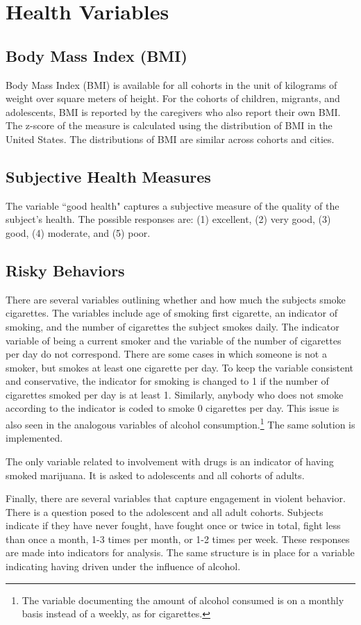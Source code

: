 \section{Health Variables}
\label{sec:health}

\subsection{Body Mass Index (BMI)}
Body Mass Index (BMI) is available for all cohorts in the unit of kilograms of weight over square meters of height. For the cohorts of children, migrants, and adolescents, BMI is reported by the caregivers who also report their own BMI. The z-score of the measure is calculated using the distribution of BMI in the United States. The distributions of BMI are similar across cohorts and cities.

\subsection{Subjective Health Measures}
The variable ``good health" captures a subjective measure of the quality of the subject's health. The possible responses are: (1) excellent, (2) very good, (3) good, (4) moderate, and (5) poor. 

\subsection{Risky Behaviors} 

There are several variables outlining whether and how much the subjects smoke cigarettes. The variables include age of smoking first cigarette, an indicator of smoking, and the number of cigarettes the subject smokes daily. The indicator variable of being a current smoker and the variable of the number of cigarettes per day do not correspond. There are some cases in which someone is not a smoker, but smokes at least one cigarette per day. To keep the variable consistent and conservative, the indicator for smoking is changed to 1 if the number of cigarettes smoked per day is at least 1. Similarly, anybody who does not smoke according to the indicator is coded to smoke 0 cigarettes per day. This issue is also seen in the analogous variables of alcohol consumption.\footnote{The variable documenting the amount of alcohol consumed is on a monthly basis instead of a weekly, as for cigarettes.} The same solution is implemented. 

The only variable related to involvement with drugs is an indicator of having smoked marijuana. It is asked to adolescents and all cohorts of adults.

Finally, there are several variables that capture engagement in violent behavior. There is a question posed to the adolescent and all adult cohorts. Subjects indicate if they have never fought, have fought once or twice in total, fight less than once a month, 1-3 times per month, or 1-2 times per week. These responses are made into indicators for analysis. The same structure is in place for a variable indicating having driven under the influence of alcohol.









